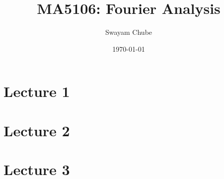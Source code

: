\documentclass{report}
\title{MA5106: Fourier Analysis}
\author{Swayam Chube}
\date{\today}
\begin{document}
\maketitle

\tableofcontents

\chapter{Lecture 1}


\chapter{Lecture 2}


\chapter{Lecture 3}

\end{document}
